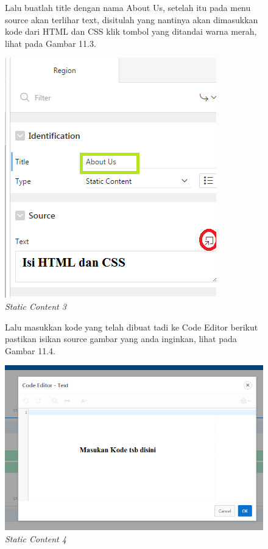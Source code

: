 \begin{enumerate}
    \begin{figure}
    \item Lalu buatlah title dengan nama About Us, setelah itu pada menu source akan terlihar text, disitulah yang nantinya akan dimasukkan kode dari HTML dan CSS klik tombol yang ditandai warna merah, lihat pada Gambar 11.3.
    
        \centering
        \includegraphics[scale=0.5]{figures/bab11/3.png}
        \caption{\textit{Static Content 3}}
        \label{Static Content 3}
    \end{figure}
    
    \begin{figure}
    \item Lalu masukkan kode yang telah dibuat tadi ke Code Editor berikut pastikan isikan source gambar yang anda inginkan, lihat pada Gambar 11.4.
        
        \centering
        \includegraphics[scale=0.5]{figures/bab11/4.png}
        \caption{\textit{Static Content 4}}
        \label{Static Content4}
    \end{figure}
    

\end{enumerate}
